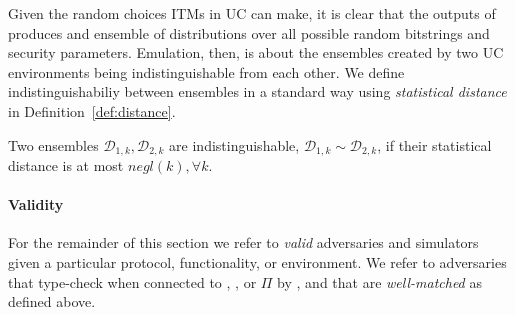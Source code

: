 Given the random choices ITMs in UC can make, it is clear that the outputs of  produces and ensemble of distributions over all possible random bitstrings and security parameters.
Emulation, then, is about the ensembles created by two UC environments being indistinguishable from each other.
We define indistinguishabiliy between ensembles in a standard way using \textit{statistical distance} in Definition~\ref{def:distance}.

\begin{definition}[Indisinguishability]\label{def:distance}
Two ensembles $\mathcal{D}_{1,k}, \mathcal{D}_{2,k}$ are indistinguishable, $\mathcal{D}_{1,k} \sim \mathcal{D}_{2,k}$, if their statistical distance is at most $negl(k), \forall k$.
\end{definition}

\paragraph{Validity}
For the remainder of this section we refer to \emph{valid} adversaries and simulators given a particular protocol, functionality, or environment.
We refer to adversaries that type-check when connected to \Z, \F, or $\Pi$ by , and that are \emph{well-matched} as defined above. 



